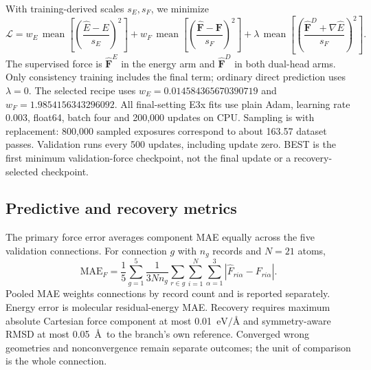 \documentclass{article}
\newcommand{\forceunit}{\mathrm{eV}/\text{\AA}}
\begin{document}
With training-derived scales $s_E,s_F$, we minimize
\begin{equation}
\mathcal L= w_E\,\operatorname{mean}\!\left[\left(\frac{\widehat E-E}{s_E}\right)^2\right]
+w_F\,\operatorname{mean}\!\left[\left(\frac{\widehat{\mathbf F}-\mathbf F}{s_F}\right)^2\right]
+\lambda\,\operatorname{mean}\!\left[\left(\frac{\widehat{\mathbf F}^{D}+\nabla\widehat E}{s_F}\right)^2\right].
\end{equation}
The supervised force is $\widehat{\mathbf F}^{E}$ in the energy arm and $\widehat{\mathbf F}^{D}$ in both dual-head arms. Only consistency training includes the final term; ordinary direct prediction uses $\lambda=0$. The selected recipe uses $w_E=0.014584365670390719$ and $w_F=1.9854156343296092$. All final-setting E3x fits use plain Adam, learning rate 0.003, float64, batch four and 200,000 updates on CPU. Sampling is with replacement: 800,000 sampled exposures correspond to about 163.57 dataset passes. Validation runs every 500 updates, including update zero. BEST is the first minimum validation-force checkpoint, not the final update or a recovery-selected checkpoint.
\subsection{Predictive and recovery metrics}
The primary force error averages component MAE equally across the five validation connections. For connection $g$ with $n_g$ records and $N=21$ atoms,
\begin{equation}
\mathrm{MAE}_{F}=\frac{1}{5}\sum_{g=1}^{5}\frac{1}{3Nn_g}
\sum_{r\in g}\sum_{i=1}^{N}\sum_{\alpha=1}^{3}
|\widehat F_{ri\alpha}-F_{ri\alpha}|.
\end{equation}
Pooled MAE weights connections by record count and is reported separately. Energy error is molecular residual-energy MAE. Recovery requires maximum absolute Cartesian force component at most 0.01~$\forceunit$ and symmetry-aware RMSD at most 0.05~\AA\ to the branch's own reference. Converged wrong geometries and nonconvergence remain separate outcomes; the unit of comparison is the whole connection.
\end{document}
